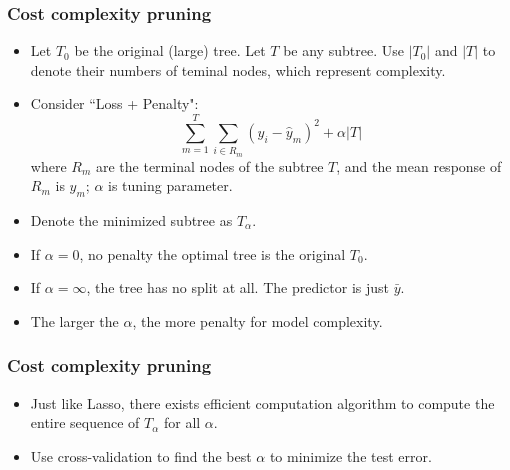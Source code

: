 \documentclass{beamer}
\begin{document}
       \begin{frame}
       	\frametitle{ Cost complexity pruning}
       	\begin{itemize}	
       		\item Let $T_0$ be the original (large) tree. Let $T$ be any subtree. Use 
       		$|T_0|$ and $|T|$ to denote their numbers of teminal nodes, which represent complexity. 
       		\item  Consider ``Loss + Penalty":
       		$$ \sum_{m=1}^T \sum_{i \in R_m} (y_i - \hat y_m)^2  + \alpha |T|$$
       		where $R_m$ are the terminal nodes of the subtree $T$, and the mean response 
       		of $R_m$ is $\hat y_m$;   $\alpha$ is tuning parameter.
       		\item  Denote the minimized subtree as $T_\alpha$. 
       		\item If $\alpha =0$, no penalty the optimal tree is the original $T_0$.
       		\item If $\alpha=\infty$, the tree has no split at all. The predictor is just 
       		$\bar y$.
       		\item The larger the $\alpha$, the more penalty for model complexity.
       		  	\end{itemize}
       		  \end{frame} 
       		  \begin{frame}
       		  	\frametitle{ Cost complexity pruning}
       		  	\begin{itemize}	
      
       		\item Just like Lasso, there   exists efficient computation algorithm to compute the entire sequence of $T_\alpha$ for all $\alpha$. 
       	 
       		\item Use cross-validation to find the best $\alpha$ to minimize the test error.
       	 
       	\end{itemize}
       \end{frame} 
       
\end{document}
